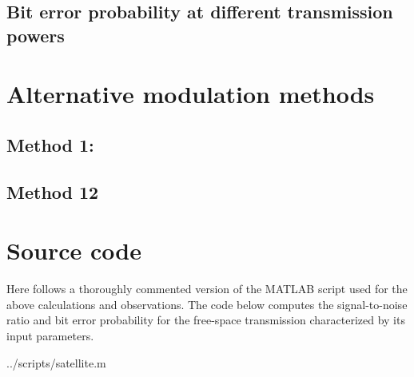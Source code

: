 






\subsection{Bit error probability at different transmission powers}


\section{Alternative modulation methods}

\subsection{Method 1: }

\subsection{Method 12 }


\section{Source code}
Here follows a thoroughly commented version of the MATLAB script used for the above calculations and observations.
The code below computes the signal-to-noise ratio and bit error probability for the free-space transmission characterized by its input parameters.

\begin{lstinputlisting}[language=Octave]{../scripts/satellite.m}
\end{lstinputlisting}
